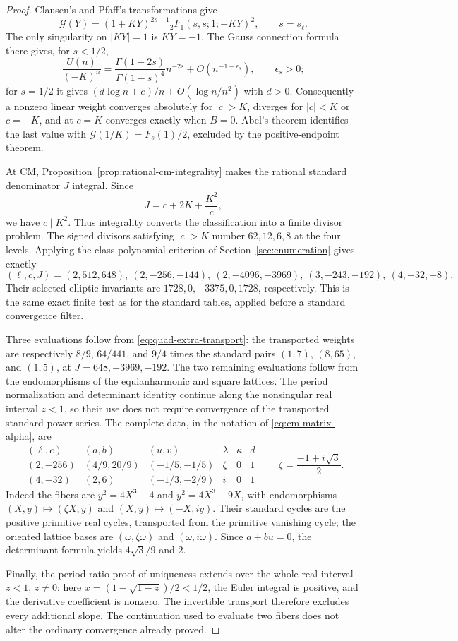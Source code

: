 \begin{proof}
Clausen's and Pfaff's transformations give
\[
 \mathcal G(Y)=(1+KY)^{2s-1}{}_2F_1(s,s;1;-KY)^2,
 \qquad s=s_\ell.
\]
The only singularity on $|KY|=1$ is $KY=-1$. The Gauss connection
formula there gives, for $s<1/2$,
\[
 \frac{U(n)}{(-K)^n}
 =\frac{\Gamma(1-2s)}{\Gamma(1-s)^4}n^{-2s}
       +O(n^{-1-\epsilon_s}),\qquad \epsilon_s>0;
\]
for $s=1/2$ it gives $(d\log n+e)/n+O(\log n/n^2)$ with $d>0$.
Consequently a nonzero linear weight converges absolutely for $|c|>K$,
diverges for $|c|<K$ or $c=-K$, and at $c=K$ converges exactly when
$B=0$. Abel's theorem identifies the last value with
$\mathcal G(1/K)=F_s(1)/2$, excluded by the positive-endpoint theorem.

At CM, Proposition~\ref{prop:rational-cm-integrality} makes the rational
standard denominator $J$ integral. Since
\[
 J=c+2K+\frac{K^2}{c},
\]
we have $c\mid K^2$. Thus integrality converts the classification into
a finite divisor problem. The signed divisors satisfying $|c|>K$ number
$62,12,6,8$ at the four levels. Applying the class-polynomial criterion
of Section~\ref{sec:enumeration} gives exactly
\[
 (\ell,c,J)=(2,512,648),\ (2,-256,-144),\ (2,-4096,-3969),
             \ (3,-243,-192),\ (4,-32,-8).
\]
Their selected elliptic invariants are $1728,0,-3375,0,1728$,
respectively. This is the same exact finite test as for the standard
tables, applied before a standard convergence filter.

Three evaluations follow from \eqref{eq:quad-extra-transport}: the
transported weights are respectively $8/9$, $64/441$, and $9/4$ times
the standard pairs $(1,7)$, $(8,65)$, and $(1,5)$, at
$J=648,-3969,-192$. The two remaining evaluations follow from the
endomorphisms of the equianharmonic and square lattices. The period
normalization and determinant identity continue along the nonsingular
real interval $z<1$, so their use does not require convergence of the
transported standard power series. The complete data, in the notation
of \eqref{eq:cm-matrix-alpha}, are
\[
\begin{array}{c|c|c|c|c|c}
 (\ell,c)&(a,b)&(u,v)&\lambda&\kappa&d\\\hline
 (2,-256)&(4/9,20/9)&(-1/5,-1/5)&\zeta&0&1\\
 (4,-32)&(2,6)&(-1/3,-2/9)&i&0&1
\end{array}
 \qquad \zeta=\frac{-1+i\sqrt3}{2}.
\]
Indeed the fibers are $y^2=4X^3-4$ and $y^2=4X^3-9X$, with
endomorphisms $(X,y)\mapsto(\zeta X,y)$ and
$(X,y)\mapsto(-X,iy)$. Their standard cycles are the positive primitive
real cycles, transported from the primitive vanishing cycle; the
oriented lattice bases are $(\omega,\zeta\omega)$ and
$(\omega,i\omega)$. Since $a+bu=0$, the determinant formula yields
$4\sqrt3/9$ and $2$.

Finally, the period-ratio proof of uniqueness extends over the whole
real interval $z<1$, $z\ne0$: here
$x=(1-\sqrt{1-z})/2<1/2$, the Euler integral is positive, and the
derivative coefficient is nonzero. The invertible transport therefore
excludes every additional slope. The continuation used to evaluate
two fibers does not alter the ordinary convergence already proved.
\end{proof}

